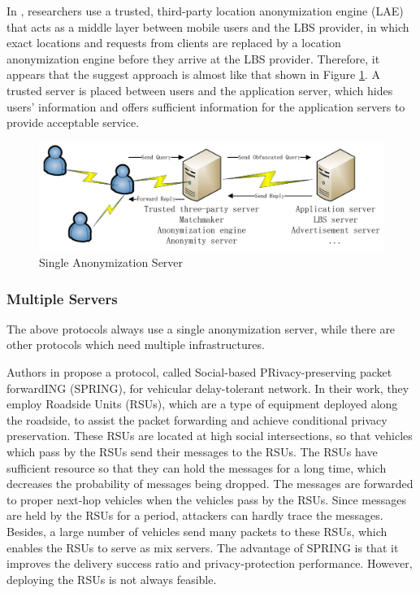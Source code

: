 In \cite {C24}, researchers use a trusted, third-party location anonymization engine (LAE) that acts as a middle layer between mobile users and the LBS provider, in which exact locations and requests from clients are replaced by a location anonymization engine before they arrive at the LBS provider. Therefore, it appears that the suggest approach is almost like that shown in Figure \ref{fig:SingleAnoymizationServer}. A trusted server is placed between users and the application server, which hides users' information and offers sufficient information for the application servers to provide acceptable service. 

\begin{figure} [H]
  \centering 
  \includegraphics[width=5.0in]{figures/Fig_Single_Ano_Ser.png}
  \caption{Single Anonymization Server} 
  \label{fig:SingleAnoymizationServer} %
\end{figure}

\subsubsection{ Multiple Servers}

\noindent The above protocols always use a single anonymization server, while there are other protocols which need multiple infrastructures. 

Authors in \cite{C25} propose a protocol, called Social-based PRivacy-preserving packet forwardING (SPRING), for vehicular delay-tolerant network. In their work, they employ Roadside Units (RSUs), which are a type of equipment deployed along the roadside, to assist the packet forwarding and achieve conditional privacy preservation. These RSUs are located at high social intersections, so that vehicles which pass by the RSUs send their messages to the RSUs. The RSUs have sufficient resource so that they can hold the messages for a long time, which decreases the probability of messages being dropped. The messages are forwarded to proper next-hop vehicles when the vehicles pass by the RSUs. Since messages are held by the RSUs for a period, attackers can hardly trace the messages. Besides, a large number of vehicles send many packets to these RSUs, which enables the RSUs to serve as mix servers. The advantage of SPRING is that it improves the delivery success ratio and privacy-protection performance. However, deploying the RSUs is not always feasible.

